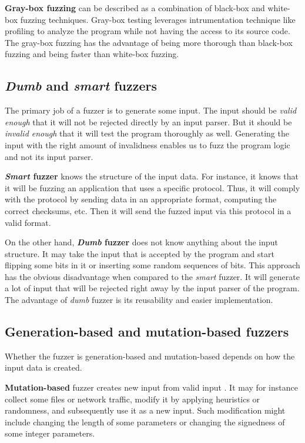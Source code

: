 \textbf{Gray-box fuzzing} can be described as a combination of black-box and white-box fuzzing techniques. Gray-box testing leverages intrumentation technique like profiling to analyze the program while not having the access to its source code. The gray-box fuzzing has the advantage of being more thorough than black-box fuzzing and being faster than white-box fuzzing.


\subsection{\emph{Dumb} and \emph{smart} fuzzers}
\label{ssub:Dumb and smart fuzzers}
The primary job of a fuzzer is to generate some input. The input should be \emph{valid enough} that it will not be rejected directly by an input parser. But it should be \emph{invalid enough} that it will test the program thoroughly as well. Generating the input with the right amount of invalidness enables us to fuzz the program logic and not its input parser.

\textbf{\emph{Smart} fuzzer} knows the structure of the input data. For instance, it knows that it will be fuzzing an application that uses a specific protocol. Thus, it will comply with the protocol by sending data in an appropriate format, computing the correct checksums, etc. Then it will send the fuzzed input via this protocol in a valid format.

On the other hand, \textbf{\emph{Dumb} fuzzer} does not know anything about the input structure. It may take the input that is accepted by the program and start flipping some bits in it or inserting some random sequences of bits. This approach has the obvious disadvantage when compared to the \emph{smart} fuzzer. It will generate a lot of input that will be rejected right away by the input parser of the program. The advantage of \emph{dumb} fuzzer is its reusability and easier implementation.

\subsection{Generation-based and mutation-based fuzzers}
\label{ssub:Generation-based and mutation-based fuzzers}
Whether the fuzzer is generation-based and mutation-based depends on how the input data is created.

\textbf{Mutation-based} fuzzer creates new input from valid input \cite{miller2007analysis}. It may for instance collect some files or network traffic, modify it by applying heuristics or randomness, and subsequently use it as a new input. Such modification might include changing the length of some parameters or changing the signedness of some integer parameters.

